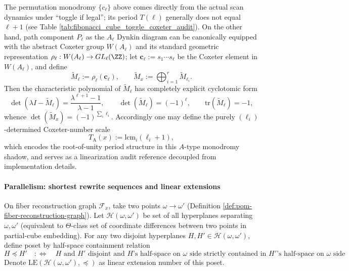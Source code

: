 \begin{remark}\label{rem:pom-Ashadow-coxeter-monodromy}
The permutation monodromy \(\{c_\ell\}\) above comes directly from the actual scan dynamics under ``toggle if legal''; its period \(T(\ell)\) generally does not equal \(\ell+1\) (see Table \ref{tab:fibonacci_cube_toggle_coxeter_audit}).
On the other hand, path component \(P_\ell\) as the \(A_\ell\) Dynkin diagram can be canonically equipped with the abstract Coxeter group \(W(A_\ell)\) and its standard geometric representation
\(\rho_\ell:W(A_\ell)\to GL_\ell(\ZZ)\);
let \(\mathbf c_\ell:=s_1\cdots s_\ell\) be the Coxeter element in \(W(A_\ell)\), and define
\[
\widetilde M_\ell:=\rho_\ell(\mathbf c_\ell),
\qquad
\widetilde M_x:=\bigoplus_{i=1}^r \widetilde M_{\ell_i}.
\]
Then the characteristic polynomial of \(\widetilde M_\ell\) has completely explicit cyclotomic form
\[
\det(\lambda I-\widetilde M_\ell)=\frac{\lambda^{\ell+1}-1}{\lambda-1},
\qquad
\det(\widetilde M_\ell)=(-1)^\ell,\qquad \mathrm{tr}(\widetilde M_\ell)=-1,
\]
whence \(\det(\widetilde M_x)=(-1)^{\sum_i \ell_i}\).
Accordingly one may define the purely \((\ell_i)\)-determined Coxeter-number scale
\[
T_{\mathrm A}(x):=\mathrm{lcm}_i(\ell_i+1),
\]
which encodes the root-of-unity period structure in this \(A\)-type monodromy shadow, and serves as a linearization audit reference decoupled from implementation details.
\end{remark}

\paragraph{Parallelism: shortest rewrite sequences and linear extensions}

\begin{definition}\label{def:pom-fiber-geodesic-poset}
On fiber reconstruction graph \(\mathcal F_x\), take two points \(\omega\to \omega'\) (Definition \ref{def:pom-fiber-reconstruction-graph}).
Let \(\mathcal H(\omega,\omega')\) be set of all hyperplanes separating \(\omega,\omega'\) (equivalent to \(\Theta\)-class set of coordinate differences between two points in partial-cube embedding).
For any two disjoint hyperplanes \(H,H'\in\mathcal H(\omega,\omega')\), define poset by half-space containment relation
\[
H\preceq H'\quad:\Longleftrightarrow\quad
\text{\(H\) and \(H'\) disjoint and \(H\)'s half-space on \(\omega\) side strictly contained in \(H'\)'s half-space on \(\omega\) side}.
\]
Denote \(\mathrm{LE}(\mathcal H(\omega,\omega'),\preceq)\) as linear extension number of this poset.
\end{definition}

